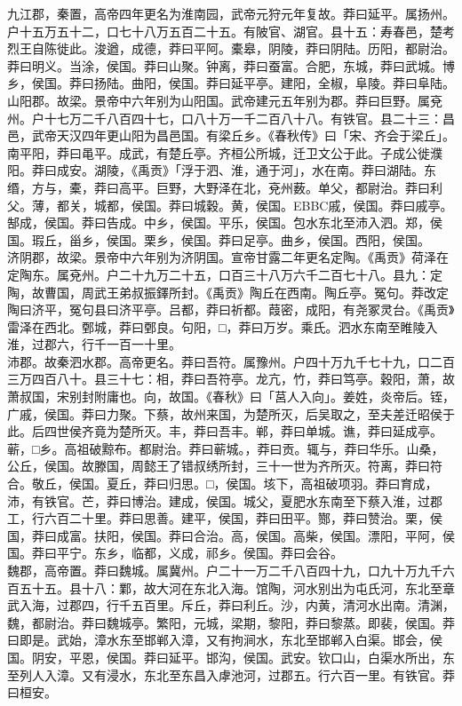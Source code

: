 \documentclass[]{article}
\begin{document}
九江郡，秦置，高帝四年更名为淮南园，武帝元狩元年复故。莽曰延平。属扬州。户十五万五十二，口七十八万五百二十五。有陂官、湖官。县十五：寿春邑，楚考烈王自陈徙此。浚遒，成德，莽曰平阿。橐皋，阴陵，莽曰阴陆。历阳，都尉治。莽曰明义。当涂，侯国。莽曰山聚。钟离，莽曰蚕富。合肥，东城，莽曰武城。博乡，侯国。莽曰扬陆。曲阳，侯国。莽曰延平亭。建阳，全椒，阜陵。莽曰阜陆。\\
山阳郡。故梁。景帝中六年别为山阳国。武帝建元五年别为郡。莽曰巨野。属兗州。户十七万二千八百四十七，口八十万一千二百八十八。有铁官。县二十三：昌邑，武帝天汉四年更山阳为昌邑国。有梁丘乡。《春秋传》曰「宋、齐会于梁丘」。南平阳，莽曰黾平。成武，有楚丘亭。齐桓公所城，迁卫文公于此。子成公徙濮阳。莽曰成安。湖陵，《禹贡》「浮于泗、淮，通于河」，水在南。莽曰湖陆。东缗，方与，橐，莽曰高平。巨野，大野泽在北，兗州薮。单父，都尉治。莽曰利父。薄，都关，城都，侯国。莽曰城穀。黄，侯国。EBBC戚，侯国。莽曰戚亭。郜成，侯国。莽曰告成。中乡，侯国。平乐，侯国。包水东北至沛入泗。郑，侯国。瑕丘，甾乡，侯国。栗乡，侯国。莽曰足亭。曲乡，侯国。西阳，侯国。\\
济阴郡，故梁。景帝中六年别为济阴国。宣帝甘露二年更名定陶。《禹贡》荷泽在定陶东。属兗州。户二十九万二十五，口百三十八万六千二百七十八。县九：定陶，故曹国，周武王弟叔振鐸所封。《禹贡》陶丘在西南。陶丘亭。冤句。莽改定陶曰济平，冤句县曰济平亭。吕都，莽曰祈都。葭密，成阳，有尧冢灵台。《禹贡》雷泽在西北。鄄城，莽曰鄄良。句阳，□，莽曰万岁。乘氏。泗水东南至睢陵入淮，过郡六，行千一百一十里。\\
沛郡。故秦泗水郡。高帝更名。莽曰吾符。属豫州。户四十万九千七十九，口二百三万四百八十。县三十七：相，莽曰吾符亭。龙亢，竹，莽曰笃亭。穀阳，萧，故萧叔国，宋别封附庸也。向，故国。《春秋》曰「莒人入向」。姜姓，炎帝后。铚，广戚，侯国。莽曰力聚。下蔡，故州来国，为楚所灭，后吴取之，至夫差迁昭侯于此。后四世侯齐竟为楚所灭。丰，莽曰吾丰。郸，莽曰单城。谯，莽曰延成亭。蕲，□乡。高祖破黥布。都尉治。莽曰蕲城。，莽曰贡。辄与，莽曰华乐。山桑，公丘，侯国。故滕国，周懿王了错叔绣所封，三十一世为齐所灭。符离，莽曰符合。敬丘，侯国。夏丘，莽曰归思。□，侯国。垓下，高祖破项羽。莽曰育成，沛，有铁官。芒，莽曰博治。建成，侯国。城父，夏肥水东南至下蔡入淮，过郡工，行六百二十里。莽曰思善。建平，侯国，莽曰田平。酂，莽曰赞治。栗，侯国，莽曰成富。扶阳，侯国。莽曰合治。高，侯国。高柴，侯国。漂阳，平阿，侯国。莽曰平宁。东乡，临都，义成，祁乡。侯国。莽曰会谷。\\
魏郡，高帝置。莽曰魏城。属冀州。户二十一万二千八百四十九，口九十万九千六百五十五。县十八：鄴，故大河在东北入海。馆陶，河水别出为屯氏河，东北至章武入海，过郡四，行千五百里。斥丘，莽曰利丘。沙，内黄，清河水出南。清渊，魏，都尉治。莽曰魏城亭。繁阳，元城，梁期，黎阳，莽曰黎蒸。即裴，侯国。莽曰即是。武始，漳水东至邯郸入漳，又有拘涧水，东北至邯郸入白渠。邯会，侯国。阴安，平恩，侯国。莽曰延平。邯沟，侯国。武安。钦口山，白渠水所出，东至列人入漳。又有浸水，东北至东昌入虖池河，过郡五。行六百一里。有铁官。莽曰桓安。\\
\end{document}
